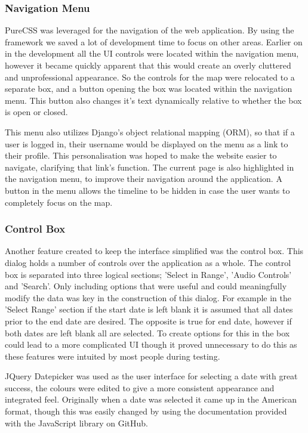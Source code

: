 \documentclass{l3proj}
\begin{document}
\subsubsection{Navigation Menu}		PureCSS was leveraged for the navigation of the web application. By using the framework we saved a lot of development time to focus on other areas. Earlier on in the development all the UI controls were located within the navigation menu, however it became quickly apparent that this would create an overly cluttered and unprofessional appearance. So the controls for the map were relocated to a separate box, and a button opening the box was located within the navigation menu. This button also changes it's text dynamically relative to whether the box is open or closed.

This menu also utilizes Django's object relational mapping (ORM), so that if a user is logged in, their username would be displayed on the menu as a link to their profile. This personalisation was hoped to make the website easier to navigate, clarifying that link's function. The current page is also highlighted in the navigation menu, to improve their navigation around the application. A button in the menu allows the timeline to be hidden in case the user wants to completely focus on the map.

\subsubsection{Control Box}		Another feature created to keep the interface simplified was the control box. This dialog holds a number of controls over the application as a whole. The control box is separated into three logical sections; 'Select in Range', 'Audio Controls' and 'Search'. Only including options that were useful and could meaningfully modify the data was key in the construction of this dialog. For example in the 'Select Range' section if the start date is left blank it is assumed that all dates prior to the end date are desired. The opposite is true for end date, however if both dates are left blank all are selected. To create options for this in the box could lead to a more complicated UI though it proved unnecessary to do this as these features were intuited by most people during testing.

\gls{JQuery} Datepicker\cite{jQueryDatepicker} was used as the user interface for selecting a date with great success, the colours were edited to give a more consistent appearance and integrated feel. Originally when a date was selected it came up in the American format, though this was easily changed by using the documentation provided with the JavaScript library on GitHub.
\end{document}
